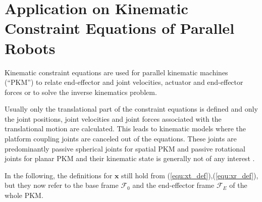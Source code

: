 \documentclass[twocolumn,10pt]{IFTOMM}
\newcommand{\bm}[1]{\boldsymbol{#1}}
\newcommand{\ks}[1]{{\mathcal{F}}_{#1}}
\begin{document}
\section{Application on Kinematic Constraint Equations of Parallel Robots}
\label{sec:ParRobKinConstr}

Kinematic constraint equations are used for parallel kinematic machines (``PKM'') to relate end-effector and joint velocities, actuator and end-effector forces or to solve the inverse kinematics problem.

Usually only the translational part of the constraint equations is defined and only the joint positions, joint velocities and joint forces associated with the translational motion are calculated.
This leads to kinematic models where the platform coupling joints are canceled out of the equations. These joints are predominantly passive spherical joints for spatial PKM and passive rotational joints for planar PKM and their kinematic state is generally not of any interest \cite{Merlet2006}.

In the following, the definitions for $\bm{x}$ still hold from  (\ref{equ:xt_def}),(\ref{equ:xr_def}), but they now refer to the base frame $\ks{0}$ and the end-effector frame $\ks{E}$ of the whole PKM.
\end{document}
